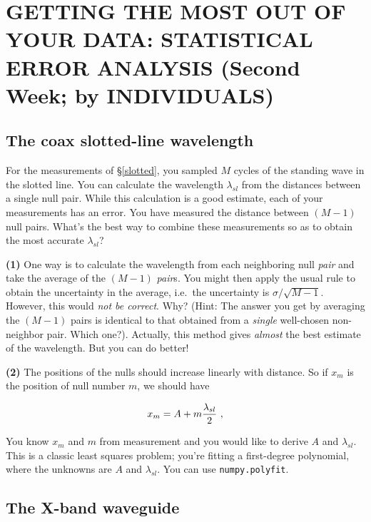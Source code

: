 \documentclass[12pt,preprint]{aastex}
\begin{document}
\section {GETTING THE MOST OUT OF YOUR DATA: STATISTICAL ERROR
ANALYSIS (Second Week; by INDIVIDUALS)} \label{secondweek}

\subsection{The coax slotted-line wavelength} \label{lbandcoax} 
\label{slottedls}

	For the measurements of \S \ref{slotted}, you sampled $M$
        cycles of the standing wave in the slotted line. You can
        calculate the wavelength $\lambda_{sl}$ from the distances
        between a single null pair. While this calculation is a good
        estimate, each of your measurements has an error. You have
        measured the distance between $(M-1)$ null pairs. What's the
        best way to combine these measurements so as to obtain the most
        accurate $\lambda_{sl}$?

{\bf (1)} One way is to calculate the wavelength from each neighboring
null {\it pair} and take the average of the $(M-1)$ {\it pair}s.  You
might then apply the usual rule to obtain the uncertainty in the
average, i.e.\ the uncertainty is $\sigma/\sqrt{M-1}$.
However, this would {\it not be correct}.  Why? (Hint: The answer you
get by averaging the $(M-1)$ pairs is identical to that obtained from a
{\it single} well-chosen non-neighbor pair.  Which one?).  Actually,
this method gives {\it almost} the best estimate of the wavelength.  But
you can do better!

	{\bf (2)} The positions of the nulls should increase linearly
with distance. So if $x_{m}$ is the position of null number $m$, we
should have

\begin{equation}
x_m = A + m {\lambda_{sl} \over 2} \ ,
\end{equation}

\noindent You know $x_m$ and $m$ from measurement and you would like to
derive $A$ and $\lambda_{sl}$. This is a classic least squares problem;
you're fitting a first-degree polynomial, where the unknowns are $A$ and
$\lambda_{sl}$. You can use {\tt numpy.polyfit}.

\subsection{The X-band waveguide}
\end{document}

